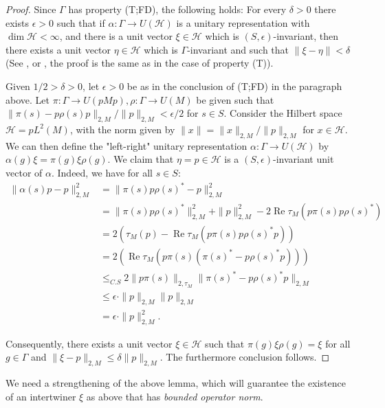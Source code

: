 \documentclass[11pt]{amsart}
\DeclareMathOperator{\Ra}{Re}
\newcommand{\cH}{{\mathcal{H}}}
\theoremstyle{definition}
\theoremstyle{remark}
\theoremstyle{definition}
\begin{document}
\begin{proof}
    Since $\Gamma$ has property (T;FD), the following holds: For every $\delta>0$ there exists $\epsilon> 0$ such that if $\alpha:\Gamma \to U(\cH)$ is a unitary representation with $\dim \cH < \infty$, and there is a unit vector $\xi \in \cH$ which is $(S,\epsilon)$-invariant, then there exists a unit vector $\eta \in \cH$ which is $\Gamma$-invariant and such that $\| \xi - \eta \| < \delta$ (See \cite[Proposition 1.1.9]{BdlH}, or \cite[Corollary 15.1.4]{Popa}, the proof is the same as in the case of property (T)).

Given $1/2>\delta>0$, let $\epsilon > 0$ be as in the conclusion of (T;FD) in the paragraph above.
Let $\pi: \Gamma \to U(pMp),\rho: \Gamma \to U(M)$ be given such that $\| \pi(s) - p\rho(s) p\|_{2,M} / \|p \|_{2,M}< \epsilon/2$ for $s \in S$.
Consider the Hilbert space $\cH = pL^2(M)$, with the norm given by $\|  x\| = \| x \|_{2,M} / \|p \|_{2,M}$ for $x \in \cH$.
We can then define the "left-right" unitary representation $\alpha: \Gamma \to U(\cH)$ by $\alpha(g) \xi =\pi(g) \xi \rho(g)$.
We claim that $\eta = p \in \cH$ is a $(S,\epsilon)$-invariant unit vector of $\alpha$. 
Indeed, we have for all $s \in S$:
\begin{align*}
    \| \alpha(s)p - p\|_{2,M}^2 &=  \| \pi(s)p \rho(s)^*- p\|_{2,M}^2 \\
    &= \| \pi(s) p \rho(s)^* \|_{2,M}^2 + \| p \|_{2,M}^2 - 2\Ra{\tau_{M}(p\pi(s)p\rho(s)^*)} \\
    &= 2 \left(\tau_{M}(p) - \Ra{\tau_{M}(p\pi(s)p\rho(s)^*p)} \right)\\
    &= 2 \left(\Ra{\tau_{M}(p\pi(s)(\pi(s)^* - p\rho(s)^*p))} \right)\\
    &\leq_{C.S} 2 \| p\pi(s) \|_{2,\tau_{M}} \| \pi(s)^* - p\rho(s)^*p \|_{2,M}\\
    &\leq \epsilon \cdot  \| p \|_{2,M} \|p \|_{2,M}\\
    &
= \epsilon \cdot  \| p \|_{2,M}^2.
\end{align*}

Consequently, there exists a unit vector $\xi \in \cH $ such that  $\pi(g)\xi \rho(g) = \xi$ for all $g \in \Gamma$ and $\| \xi - p \|_{2,M} \leq \delta \| p \|_{2,M}$. The furthermore conclusion follows.
\end{proof}


We need a strengthening of the above lemma, which will guarantee the existence of an intertwiner $\xi$ as above that has \emph{bounded operator norm}.
\end{document}

